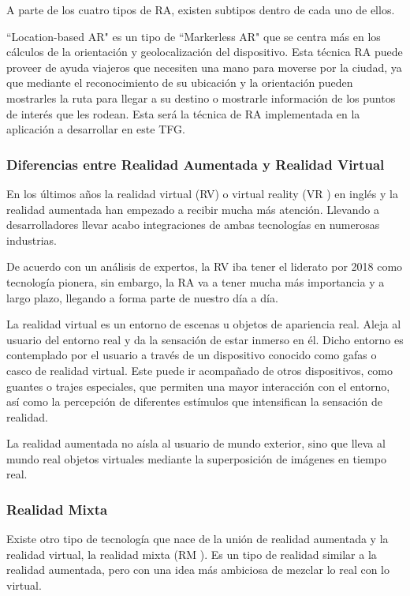 A parte de los cuatro tipos de RA, existen subtipos dentro de cada uno de ellos.

``Location-based AR" es un tipo de ``Markerless AR"  que se centra más en los cálculos de la orientación y geolocalización del dispositivo. Esta técnica RA puede proveer de ayuda viajeros que necesiten una mano para moverse por la ciudad, ya que mediante el reconocimiento de su ubicación y la orientación pueden mostrarles la ruta para llegar a su destino o mostrarle información de los puntos de interés que les rodean. Esta será la técnica de RA implementada en la aplicación a desarrollar en este TFG. 


\subsubsection{Diferencias entre Realidad Aumentada y Realidad Virtual}
En los últimos años la realidad virtual (RV)  o virtual reality (VR \cite{URL::VR}) en inglés y la realidad aumentada han empezado a recibir mucha más atención. Llevando a desarrolladores llevar acabo integraciones de ambas tecnologías en numerosas industrias.

De acuerdo con un análisis de expertos, la RV iba tener el liderato por 2018 como tecnología pionera, sin embargo, la RA va a tener mucha más importancia y a largo plazo, llegando a forma parte de nuestro día a día.

La realidad virtual es un entorno de escenas u objetos de apariencia real. Aleja al usuario del entorno real y da la sensación de estar inmerso en él. Dicho entorno es contemplado por el usuario a través de un dispositivo conocido como gafas o casco de realidad virtual. Este puede ir acompañado de otros dispositivos, como guantes o trajes especiales, que permiten una mayor interacción con el entorno, así como la percepción de diferentes estímulos que intensifican la sensación de realidad.

La realidad aumentada no aísla al usuario de mundo exterior, sino que lleva al mundo real objetos virtuales mediante la superposición de imágenes en tiempo real. 

\subsubsection{Realidad Mixta}

Existe otro tipo de tecnología que nace de la unión de realidad aumentada y la realidad virtual, la realidad mixta (RM \cite{URL::RM}). Es un tipo de realidad similar a la realidad aumentada, pero con una idea más ambiciosa de mezclar lo real con lo virtual.

